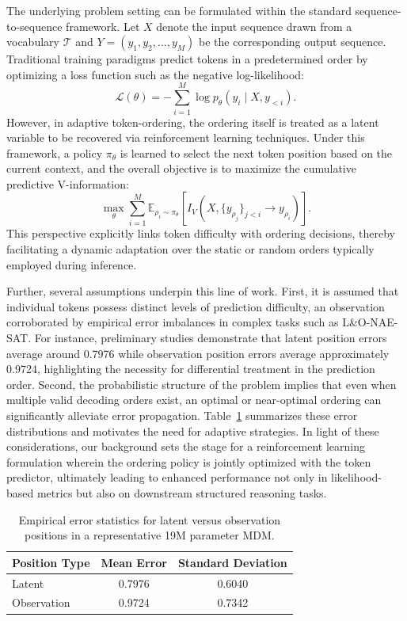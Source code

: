 \documentclass{article}
\begin{document}
The underlying problem setting can be formulated within the standard sequence-to-sequence framework. Let \( X \) denote the input sequence drawn from a vocabulary \( \mathcal{T} \) and \( Y = (y_1, y_2, \dots, y_M) \) be the corresponding output sequence. Traditional training paradigms predict tokens in a predetermined order by optimizing a loss function such as the negative log-likelihood:
\[
\mathcal{L}(\theta) = -\sum_{i=1}^{M} \log p_\theta(y_i \mid X, y_{<i}).
\]
However, in adaptive token-ordering, the ordering itself is treated as a latent variable to be recovered via reinforcement learning techniques. Under this framework, a policy \( \pi_\theta \) is learned to select the next token position based on the current context, and the overall objective is to maximize the cumulative predictive V-information:
\[
\max_{\theta} \sum_{i=1}^{M} \mathbb{E}_{\rho_i \sim \pi_\theta}\left[ I_V\left(X, \{y_{\rho_j}\}_{j<i} \to y_{\rho_i}\right) \right].
\]
This perspective explicitly links token difficulty with ordering decisions, thereby facilitating a dynamic adaptation over the static or random orders typically employed during inference.

Further, several assumptions underpin this line of work. First, it is assumed that individual tokens possess distinct levels of prediction difficulty, an observation corroborated by empirical error imbalances in complex tasks such as L\&O-NAE-SAT. For instance, preliminary studies demonstrate that latent position errors average around 0.7976 while observation position errors average approximately 0.9724, highlighting the necessity for differential treatment in the prediction order. Second, the probabilistic structure of the problem implies that even when multiple valid decoding orders exist, an optimal or near-optimal ordering can significantly alleviate error propagation. Table~\ref{tab:error} summarizes these error distributions and motivates the need for adaptive strategies. In light of these considerations, our background sets the stage for a reinforcement learning formulation wherein the ordering policy is jointly optimized with the token predictor, ultimately leading to enhanced performance not only in likelihood-based metrics but also on downstream structured reasoning tasks.

\begin{table}[h]
\centering
\begin{tabular}{lcc}
\hline
Position Type  & Mean Error & Standard Deviation \\
\hline
Latent         & 0.7976     & 0.6040 \\
Observation    & 0.9724     & 0.7342 \\
\hline
\end{tabular}
\caption{Empirical error statistics for latent versus observation positions in a representative 19M parameter MDM.}
\label{tab:error}
\end{table}
\end{document}
